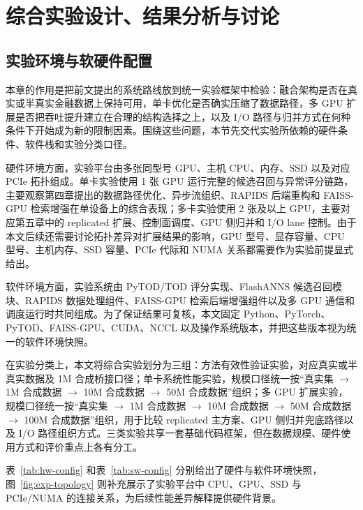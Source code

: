 
\chapter{综合实验设计、结果分析与讨论}

\section{实验环境与软硬件配置}

本章的作用是把前文提出的系统路线放到统一实验框架中检验：融合架构是否在真实或半真实金融数据上保持可用，单卡优化是否确实压缩了数据路径，多 GPU 扩展是否把吞吐提升建立在合理的结构选择之上，以及 I/O 路径与归并方式在何种条件下开始成为新的限制因素。围绕这些问题，本节先交代实验所依赖的硬件条件、软件栈和实验分类口径。

硬件环境方面，实验平台由多张同型号 GPU、主机 CPU、内存、SSD 以及对应 PCIe 拓扑组成。单卡实验使用 1 张 GPU 运行完整的候选召回与异常评分链路，主要观察第四章提出的数据路径优化、异步流组织、RAPIDS 后端重构和 FAISS-GPU 检索增强在单设备上的综合表现；多卡实验使用 2 张及以上 GPU，主要对应第五章中的 replicated 扩展、控制面调度、GPU 侧归并和 I/O lane 控制。由于本文后续还需要讨论拓扑差异对扩展结果的影响，GPU 型号、显存容量、CPU 型号、主机内存、SSD 容量、PCIe 代际和 NUMA 关系都需要作为实验前提显式给出。

软件环境方面，实验系统由 PyTOD/TOD 评分实现、FlashANNS 候选召回模块、RAPIDS 数据处理组件、FAISS-GPU 检索后端增强组件以及多 GPU 通信和调度运行时共同组成。为了保证结果可复核，本文固定 Python、PyTorch、PyTOD、FAISS-GPU、CUDA、NCCL 以及操作系统版本，并把这些版本视为统一的软件环境快照。

在实验分类上，本文将综合实验划分为三组：方法有效性验证实验，对应真实或半真实数据及 1M 合成桥接口径；单卡系统性能实验，规模口径统一按“真实集 $\rightarrow$ 1M 合成数据 $\rightarrow$ 10M 合成数据 $\rightarrow$ 50M 合成数据”组织；多 GPU 扩展实验，规模口径统一按“真实集 $\rightarrow$ 1M 合成数据 $\rightarrow$ 10M 合成数据 $\rightarrow$ 50M 合成数据 $\rightarrow$ 100M 合成数据”组织，用于比较 replicated 主方案、GPU 侧归并兜底路径以及 I/O 路径组织方式。三类实验共享一套基础代码框架，但在数据规模、硬件使用方式和评价重点上各有分工。

表~\ref{tab:hw-config} 和表~\ref{tab:sw-config} 分别给出了硬件与软件环境快照，图~\ref{fig:exp-topology} 则补充展示了实验平台中 CPU、GPU、SSD 与 PCIe/NUMA 的连接关系，为后续性能差异解释提供硬件背景。

